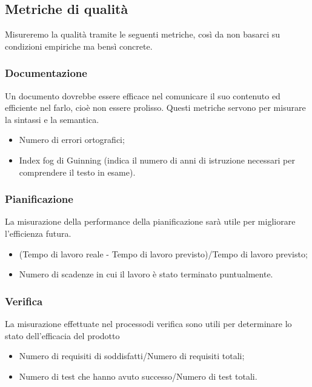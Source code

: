 \subsection{Metriche di qualità}
Misureremo la qualità tramite le seguenti metriche, così da non basarci su condizioni empiriche ma bensì concrete.

\subsubsection{Documentazione}
Un documento dovrebbe essere efficace nel comunicare il suo contenuto ed efficiente nel farlo, cioè non essere prolisso.
Questi metriche servono per misurare la sintassi e la semantica.
\begin{itemize}
	\item Numero di errori ortografici;
	\item Index fog di Guinning (indica il numero di anni di istruzione necessari per comprendere il testo in esame).
\end{itemize} 

\subsubsection{Pianificazione}
La misurazione della performance della pianificazione sarà utile per migliorare l'efficienza futura.
\begin{itemize}
	\item (Tempo di lavoro reale - Tempo di lavoro previsto)/Tempo di lavoro previsto;
	\item Numero di scadenze in cui il lavoro è stato terminato puntualmente.
\end{itemize}

\subsubsection{Verifica}
La misurazione effettuate nel processo\glosp di verifica sono utili per determinare lo stato dell'efficacia del prodotto
\begin{itemize}
	\item Numero di requisiti di soddisfatti/Numero di requisiti totali;
	\item Numero di test che hanno avuto successo/Numero di test totali.
\end{itemize}

